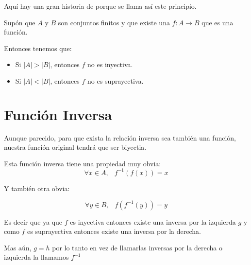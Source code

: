 \documentclass[12pt, fleqn]{report}                             %
\DeclareMathOperator \Space     {\quad}                         %
\DeclareMathOperator \MiniSpace {\;}                            %
\theoremstyle{break}                                            %
\begin{document}
            Aquí hay una gran historia de porque se llama así este principio.

            Supón que $A$ y $B$ son conjuntos finitos y que existe una $f: A \to B$ que es una función.

            Entonces tenemos que:
            \begin{itemize}
                \item Si $|A| > |B|$, entonces $f$ no es inyectiva.
                \item Si $|A| < |B|$, entonces $f$ no es suprayectiva.
            \end{itemize}





        \section{Función Inversa}

            Aunque parecido, para que exista la relación inversa sea también una función,
            nuestra función original tendrá que ser biyectia.

            Esta función inversa tiene una propiedad muy obvia:
            \begin{equation*}
                \forall x \in A, \MiniSpace f^{-1}(f(x)) = x
            \end{equation*}

            Y también otra obvia:

            \begin{equation*}
                \forall y \in B, \MiniSpace f(f^{-1}(y)) = y
            \end{equation*}


            Es decir que ya que $f$ es inyectiva entonces existe una inversa por la
            izquierda $g$ y como $f$ es suprayectiva entonces existe una inversa por la
            derecha.

            Mas aún, $g = h$ por lo tanto en vez de llamarlas inversas por la derecha o izquierda
            la llamamos $f^{-1}$





        \clearpage
\end{document}
